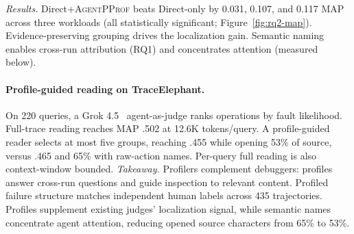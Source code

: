 \documentclass[sigconf,nonacm]{acmart}
\newif\ifshowappendix
\newcommand{\appnote}[1]{\ifshowappendix{} (#1)\fi}
\newcommand{\sys}{\textsc{AgentPProf}\xspace}
\begin{document}
\emph{Results.} Direct+\sys beats Direct-only by 0.031, 0.107, and 0.117 MAP across three workloads (all statistically significant\appnote{; 95\% intervals in Appendix~\ref{app:rq2}}; Figure~\ref{fig:rq2-map}).
Evidence-preserving grouping drives the localization gain. Semantic naming enables cross-run attribution (RQ1) and concentrates attention (measured below).

\paragraph{Profile-guided reading on TraceElephant.}
On 220 queries, a Grok 4.5~\cite{grok45} agent-as-judge ranks operations by fault likelihood.
Full-trace reading reaches MAP .502 at 12.6K tokens/query. A profile-guided reader selects at most five groups, reaching .455 while opening 53\% of source, versus .465 and 65\% with raw-action names\appnote{intervals in Appendix~\ref{app:rq2}}. Per-query full reading is also context-window bounded.
\emph{Takeaway.} Profilers complement debuggers: profiles answer cross-run questions and guide inspection to relevant content. Profiled failure structure matches independent human labels across 435 trajectories. Profiles supplement existing judges' localization signal, while semantic names concentrate agent attention, reducing opened source characters from 65\% to 53\%.
\end{document}
